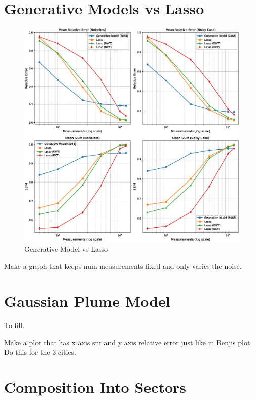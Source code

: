 \section{Generative Models vs Lasso}
\begin{figure}[h!]
    \centering
    \includegraphics[width=\textwidth]{figures/06_results/gen_vs_lasso.eps}
    \caption{Generative Model vs Lasso}
\end{figure}
Make a graph that keeps num measurements fixed and only varies the noise.

\section{Gaussian Plume Model}
To fill.

Make a plot that has x axis snr and y axis relative error just like in Benjis plot.
Do this for the 3 cities.

\section{Composition Into Sectors}

